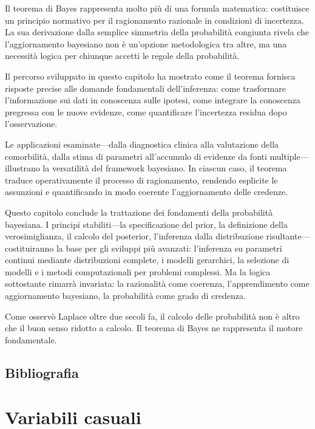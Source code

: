 \documentclass[
  letterpaper,
  DIV=11,
  numbers=noendperiod,
  oneside]{scrreprt}
\theoremstyle{definition}
\theoremstyle{plain}
\theoremstyle{definition}
\theoremstyle{remark}
\begin{document}

Il teorema di Bayes rappresenta molto più di una formula matematica:
costituisce un principio normativo per il ragionamento razionale in
condizioni di incertezza. La sua derivazione dalla semplice simmetria
della probabilità congiunta rivela che l'aggiornamento bayesiano non è
un'opzione metodologica tra altre, ma una necessità logica per chiunque
accetti le regole della probabilità.

Il percorso sviluppato in questo capitolo ha mostrato come il teorema
fornisca risposte precise alle domande fondamentali dell'inferenza: come
trasformare l'informazione sui dati in conoscenza sulle ipotesi, come
integrare la conoscenza pregressa con le nuove evidenze, come
quantificare l'incertezza residua dopo l'osservazione.

Le applicazioni esaminate---dalla diagnostica clinica alla valutazione
della comorbilità, dalla stima di parametri all'accumulo di evidenze da
fonti multiple---illustrano la versatilità del framework bayesiano. In
ciascun caso, il teorema traduce operativamente il processo di
ragionamento, rendendo esplicite le assunzioni e quantificando in modo
coerente l'aggiornamento delle credenze.

Questo capitolo conclude la trattazione dei fondamenti della probabilità
bayesiana. I principi stabiliti---la specificazione del prior, la
definizione della verosimiglianza, il calcolo del posterior, l'inferenza
dalla distribuzione risultante---costituiranno la base per gli sviluppi
più avanzati: l'inferenza su parametri continui mediante distribuzioni
complete, i modelli gerarchici, la selezione di modelli e i metodi
computazionali per problemi complessi. Ma la logica sottostante rimarrà
invariata: la razionalità come coerenza, l'apprendimento come
aggiornamento bayesiano, la probabilità come grado di credenza.

Come osservò Laplace oltre due secoli fa, il calcolo delle probabilità
non è altro che il buon senso ridotto a calcolo. Il teorema di Bayes ne
rappresenta il motore fondamentale.

\section*{Bibliografia}\label{bibliografia-2}


\chapter{Variabili casuali}\label{sec-prob-random-var}
\end{document}
